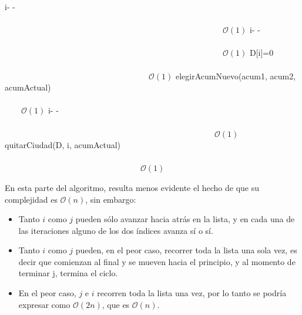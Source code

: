 \documentclass[spanish,a4paper]{article}
\begin{document}
\begin{algorithm}[H]
\begin{algorithmic}
    \ELSE
    
    \STATE i- - \ \ \ \ \ \ \ \ \ \ \ \ \ \ \ \ \ \ \ \ \ \ \ \ \ \ \ \ \ \ \ \ \ \ \ \ \ \ \ \ \ \ \ \ \ \ \ \ \ \ \ \ \ \ \ \ \ \ \ \ \ \ \ \ \ \ \ \ \ \ \ \ \ \ \ \ \ \ \ \ \ \ \ \ \ \ \ \ \ \ \ \ \ \ \ \ \ \ \ \ \ \ \ \ \ \ \ \ \ \ \ \ \ \ \ \ \ \ \ \ \ \ \ \ \ $\mathcal{O}(1)$
    \STATE i- - \ \ \ \ \ \ \ \ \ \ \ \ \ \ \ \ \ \ \ \ \ \ \ \ \ \ \ \ \ \ \ \ \ \ \ \ \ \ \ \ \ \ \ \ \ \ \ \ \ \ \ \ \ \ \ \ \ \ \ \ \ \ \ \ \ \ \ \ \ \ \ \ \ \ \ \ \ \ \ \ \ \ \ \ \ \ \ \ \ \ \ \ \ \ \ \ \ \ \ \ \ \ \ \ \ \ \ \ \ \ \ \ \ \ \ \ \ \ \ \ \ \ \ \ \ $\mathcal{O}(1)$
    \STATE D[i]=0 \ \ \ \ \ \ \ \ \ \ \ \ \ \ \ \ \ \ \ \ \ \ \ \ \ \ \ \ \ \ \ \ \ \ \ \ \ \ \ \ \ \ \ \ \ \ \ \ \ \ \ \ \ \ \ \ \ \ \ \ \ \ \ \ \ \ \ \ \ \ \ \ \ \ \ \ \ \ \ \ \ \ \ \ \ \ \ \  \ \ \ \ \ \ \ \ \ \ \ \ \ \ \ \ \ \ \ $\mathcal{O}(1)$
    \ELSE
    \STATE elegirAcumNuevo(acum1, acum2, acumActual) \ \ \ \ \ \ \ \ \ \ \ \ \ \ \ \ \ \ \ \ \ \ \ \ \ \ \ \ \ \ \ \ \ \ \ \ \ \ \ \ \ \ \ \ \ \ \ \ \ \ \ \ \ \ \ \ \ \ \ \ \ \ \ \ \ \ \ \ \ \ \ \ \ \ \ \  $\mathcal{O}(1)$
    \STATE i- - \ \ \ \ \ \ \ \ \ \ \ \ \ \ \ \ \ \ \ \ \ \ \ \ \ \ \ \ \ \ \ \ \ \ \ \ \ \ \ \ \ \ \ \ \ \ \ \ \ \ \ \ \ \ \ \ \ \ \ \ \ \ \ \ \ \ \ \ \ \ \ \ \ \ \ \ \ \ \ \ \ \ \ \ \ \ \ \ \ \ \ \ \ \ \ \ \ \ \ \ \ \ \ \ \ \ \ \ \ \ \ \ \ \ \ \ \ \ \ \ \ \ \ $\mathcal{O}(1)$
    \STATE quitarCiudad(D, i, acumActual) \ \ \ \ \ \ \ \ \ \ \ \ \ \ \ \ \ \ \ \ \ \ \ \ \ \ \ \ \ \ \ \ \ \ \ \ \ \ \ \ \ \ \ \ \ \ \ \ \ \ \ \ \ \ \ \ \ \ \ \ \ \ \ \ \ \ \ \ \ \ \ \ \ \ \ \ \ \ \ \ \ \ \ \ \ \ \ \ \ \ \ \ \ \ \ \ \ \ \ \ \ \ \ \ \ $\mathcal{O}(1)$
    \ENDIF
    
    \ENDIF
    
    \ENDWHILE

\end{algorithmic}
\end{algorithm}
\newpage
En esta parte del algoritmo, resulta menos evidente el hecho de que su complejidad es $\mathcal{O}(n)$, sin embargo:

\begin{itemize}

\item Tanto $i$ como $j$ pueden sólo avanzar hacia atrás en la lista, y en cada una de las iteraciones alguno de los dos índices avanza sí o sí.

\item Tanto $i$ como $j$ pueden, en el peor caso, recorrer toda la lista una sola vez, es decir que comienzan al final y se mueven hacia el principio, y al momento de terminar j, termina el ciclo.

\item En el peor caso, $j$ e $i$ recorren toda la lista una vez, por lo tanto se podría expresar como $\mathcal{O}(2n)$, que es $\mathcal{O}(n)$.

\end{itemize}
\end{document}
